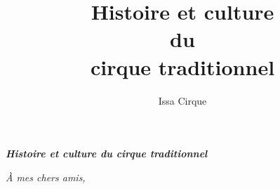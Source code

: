 \documentclass[12pt]{book} %
\begin{document}
\pagestyle{plain} 
\author{{\Large Issa Cirque}}
\title{{\Huge Histoire et culture \\
		du\\
		 cirque traditionnel}}
\date{}

\newpage
\mbox{}
\thispagestyle{empty}

\newpage
\mbox{}
\thispagestyle{empty}

\newpage
\mbox{}
\thispagestyle{empty}


\begin{center}
\vspace*{5cm}
\textit{\textbf{{\LARGE Histoire et culture du cirque traditionnel}}}

\end{center}
\newpage
\mbox{}
\thispagestyle{empty}

\maketitle

\newpage
\mbox{}
\thispagestyle{empty}

\newpage
\mbox{}
\thispagestyle{empty}
\vfill
\begin{flushright}
	\textit{À mes chers amis,}
\end{flushright}
\vfill
\newpage
\mbox{}
\thispagestyle{empty}


\setcounter{page}{8} %









\tableofcontents
\thispagestyle{empty}
\newpage
\mbox{}
\thispagestyle{empty} %
\backmatter


\nocite{*}
\end{document}
